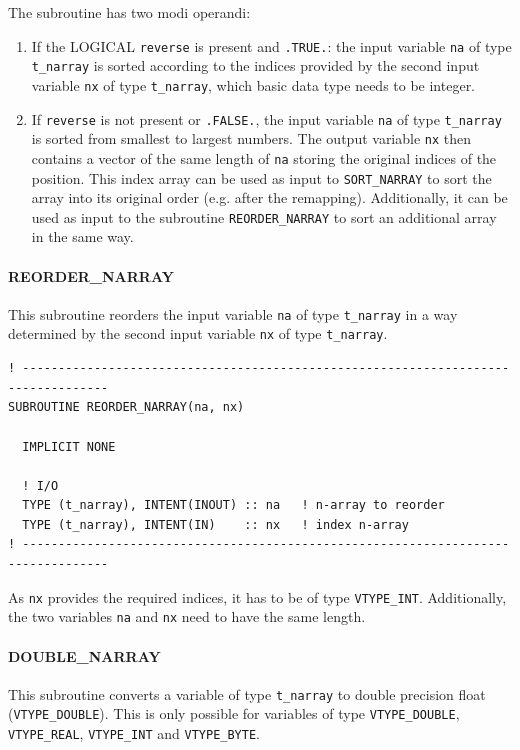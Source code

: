 \documentclass[11pt,twoside]{article}
\begin{document}
The subroutine has two modi operandi:
\begin{enumerate}
\item If the LOGICAL \verb|reverse| is present and \verb|.TRUE.|:
       the input variable \verb|na| of type \verb|t_narray| is sorted 
       according to the indices provided by the second input variable \verb|nx|
       of type \verb|t_narray|, which basic data type needs to be integer.
\item If \verb|reverse| is not present or \verb|.FALSE.|, the input variable
       \verb|na| of type \verb|t_narray| is sorted from smallest to largest
       numbers. The output variable  \verb|nx| then contains a vector of the
       same length of \verb|na| storing the original indices of  the
       position. 
       This index array can be used as input to \verb|SORT_NARRAY| to sort
       the array into its original order (e.g. after the remapping).
       Additionally, it can be used as input to the subroutine 
       \verb|REORDER_NARRAY| to sort an additional array in the same way.
\end{enumerate}

\paragraph{REORDER\_NARRAY\\ \label{REORDER}}
This subroutine reorders the input variable \verb|na| of type \verb|t_narray|
in a way determined by the second input variable  \verb|nx| of type 
\verb|t_narray|.

\begin{verbatim}
! ----------------------------------------------------------------------------------
SUBROUTINE REORDER_NARRAY(na, nx)

  IMPLICIT NONE

  ! I/O
  TYPE (t_narray), INTENT(INOUT) :: na   ! n-array to reorder
  TYPE (t_narray), INTENT(IN)    :: nx   ! index n-array
! ----------------------------------------------------------------------------------
\end{verbatim}
As \verb|nx| provides the required indices, it has to be of type 
\verb|VTYPE_INT|. Additionally, the two variables 
\verb|na| and \verb|nx| need to have the same length.

\paragraph{DOUBLE\_NARRAY\\ \label{DPARRAY}}
This subroutine converts a variable of type \verb|t_narray|
 to double precision float (\verb|VTYPE_DOUBLE|). This is only possible for
 variables of type \verb|VTYPE_DOUBLE|, \verb|VTYPE_REAL|, \verb|VTYPE_INT|
and   \verb|VTYPE_BYTE|.
\end{document}
